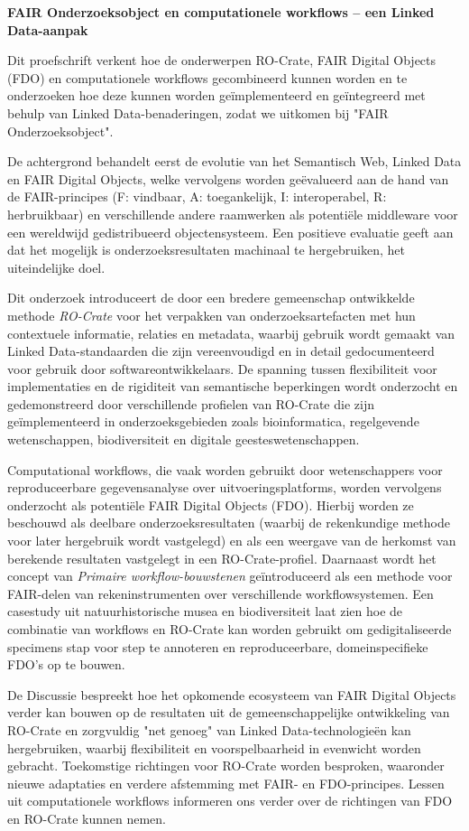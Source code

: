 \textbf{FAIR Onderzoeksobject en computationele workflows – een Linked Data-aanpak}

Dit proefschrift verkent hoe de onderwerpen RO-Crate, FAIR Digital Objects (FDO) en computationele workflows gecombineerd kunnen worden en te onderzoeken hoe deze kunnen worden geïmplementeerd en geïntegreerd met behulp van Linked Data-benaderingen, zodat we uitkomen bij "FAIR Onderzoeksobject".

De achtergrond behandelt eerst de evolutie van het Semantisch Web, Linked Data en FAIR Digital Objects, welke vervolgens worden geëvalueerd aan de hand van de FAIR-principes (F: vindbaar, A: toegankelijk, I: interoperabel, R: herbruikbaar) en verschillende andere raamwerken als potentiële middleware voor een wereldwijd gedistribueerd objectensysteem. Een positieve evaluatie geeft aan dat het mogelijk is onderzoeksresultaten machinaal te hergebruiken, het uiteindelijke doel.

Dit onderzoek introduceert de door een bredere gemeenschap ontwikkelde methode \emph{RO-Crate} voor het verpakken van onderzoeksartefacten met hun contextuele informatie, relaties en metadata, waarbij gebruik wordt gemaakt van Linked Data-standaarden die zijn vereenvoudigd en in detail gedocumenteerd voor gebruik door softwareontwikkelaars. De spanning tussen flexibiliteit voor implementaties en de rigiditeit van semantische beperkingen wordt onderzocht en gedemonstreerd door verschillende profielen van RO-Crate die zijn geïmplementeerd in onderzoeksgebieden zoals bioinformatica, regelgevende wetenschappen, biodiversiteit en digitale geesteswetenschappen.

Computational workflows, die vaak worden gebruikt door wetenschappers voor reproduceerbare gegevensanalyse over uitvoeringsplatforms, worden vervolgens onderzocht als potentiële FAIR Digital Objects (FDO). Hierbij worden ze beschouwd als deelbare onderzoeksresultaten (waarbij de rekenkundige methode voor later hergebruik wordt vastgelegd) en als een weergave van de herkomst van berekende resultaten vastgelegt in een RO-Crate-profiel. Daarnaast wordt het concept van \emph{Primaire workflow-bouwstenen} geïntroduceerd als een methode voor FAIR-delen van rekeninstrumenten over verschillende workflowsystemen. Een casestudy uit natuurhistorische musea en biodiversiteit laat zien hoe de combinatie van workflows en RO-Crate kan worden gebruikt om gedigitaliseerde specimens stap voor step te annoteren en reproduceerbare, domeinspecifieke FDO's op te bouwen.

De Discussie bespreekt hoe het opkomende ecosysteem van FAIR Digital Objects verder kan bouwen op de resultaten uit de gemeenschappelijke ontwikkeling van RO-Crate en zorgvuldig "net genoeg" van Linked Data-technologieën kan hergebruiken, waarbij flexibiliteit en voorspelbaarheid in evenwicht worden gebracht. Toekomstige richtingen voor RO-Crate worden besproken, waaronder nieuwe adaptaties en verdere afstemming met FAIR- en FDO-principes. Lessen uit computationele workflows informeren ons verder over de richtingen van FDO en RO-Crate kunnen nemen. 


